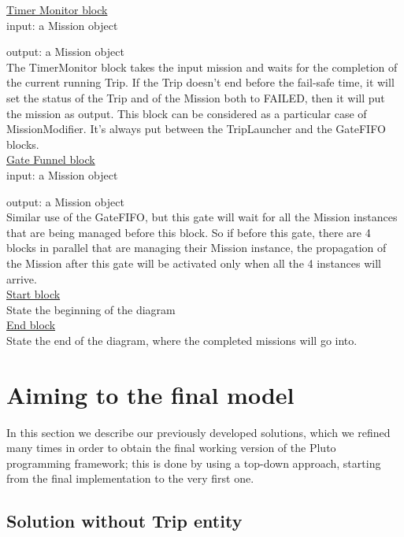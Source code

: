 \underline{Timer Monitor block}
\\

input: a Mission object

output: a Mission object
\\

The TimerMonitor block takes the input mission and waits for the completion of the current running Trip. If the Trip doesn't end before the fail-safe time, it will set the status of the Trip and of the Mission both to FAILED, then it will put the mission as output.
This block can be considered as a particular case of MissionModifier.
It's always put between the TripLauncher and the GateFIFO blocks.
\\

\underline{Gate Funnel block}
\\

input: a Mission object

output: a Mission object
\\

Similar use of the GateFIFO, but this gate will wait for all the Mission instances that are being managed before this block. So if before this gate, there are 4 blocks in parallel that are managing their Mission instance, the propagation of the Mission after this gate will be activated only when all the 4 instances will arrive.
\\

\underline{Start block}
\\
State the beginning of the diagram
\\

\underline{End block}
\\
State the end of the diagram, where the completed missions will go into.
\\

\section{Aiming to the final model}\label{history}

In this section we describe our previously developed solutions, which we refined many times in order to obtain the final working version of the Pluto programming framework; this is done by using a top-down approach, starting from the final implementation to the very first one.

\subsection{Solution without Trip entity}

